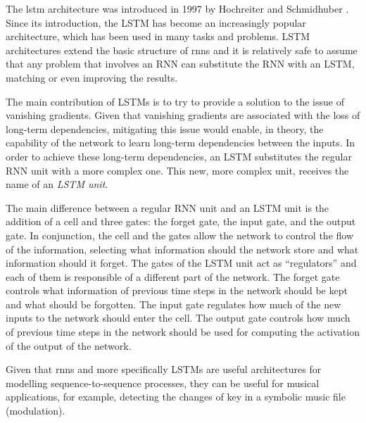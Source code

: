 

The \gls{lstm} architecture was
introduced in 1997 by Hochreiter and Schmidhuber
\parencite{hochreiter1997long}. Since its introduction, the
LSTM has become an increasingly popular architecture, which
has been used in many tasks and problems. LSTM architectures
extend the basic structure of \glspl{rnn} and it is relatively safe
to assume that any problem that involves an RNN can
substitute the RNN with an LSTM, matching or even improving
the results.

The main contribution of LSTMs is to try to provide a
solution to the issue of vanishing gradients. Given that
vanishing gradients are associated with the loss of
long-term dependencies, mitigating this issue would enable,
in theory, the capability of the network to learn long-term
dependencies between the inputs. In order to achieve these
long-term dependencies, an LSTM substitutes the regular RNN
unit with a more complex one. This new, more complex unit,
receives the name of an \emph{LSTM unit}.

The main difference between a regular RNN unit and an LSTM
unit is the addition of a cell and three gates: the forget
gate, the input gate, and the output gate. In conjunction,
the cell and the gates allow the network to control the flow
of the information, selecting what information should the
network store and what information should it forget. The
gates of the LSTM unit act as ``regulators'' and each of
them is responsible of a different part of the network. The
forget gate controls what information of previous time steps
in the network should be kept and what should be forgotten.
The input gate regulates how much of the new inputs to the
network should enter the cell. The output gate controls how
much of previous time steps in the network should be used
for computing the activation of the output of the network.

Given that \glspl{rnn} and more specifically LSTMs are useful
architectures for modelling sequence-to-sequence processes,
they can be useful for musical applications, for example,
detecting the changes of key in a symbolic music file
(modulation).


